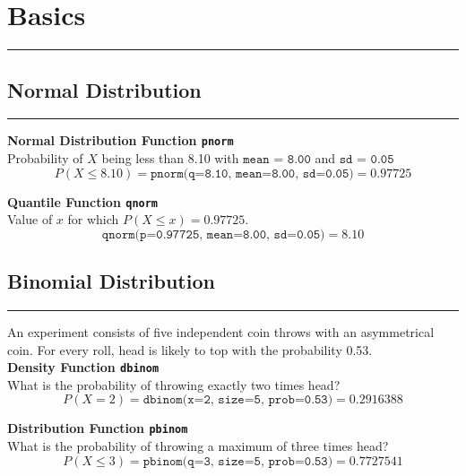 
\section{Basics}
\noindent\rule[\linienAbstand]{\linewidth}{\linienDicke}

\subsection{Normal Distribution}
\noindent\rule[\linienAbstand]{\linewidth}{\linienDicke}
\textbf{Normal Distribution Function \texttt{pnorm}}\\
Probability of $X$ being less than 8.10 with $\texttt{mean = 8.00}$ and $\texttt{sd = 0.05}$
\begin{equation*}
  P(X \leq 8.10) = \texttt{pnorm(q=8.10, mean=8.00, sd=0.05)} = 0.97725
\end{equation*}

\textbf{Quantile Function \texttt{qnorm}}\\
Value of $x$ for which $P(X \leq x) = 0.97725$.
\begin{equation*}
  \texttt{qnorm(p=0.97725, mean=8.00, sd=0.05)} = 8.10
\end{equation*}

\subsection{Binomial Distribution}
\noindent\rule[\linienAbstand]{\linewidth}{\linienDicke}
An experiment consists of five independent coin throws with an asymmetrical coin. For every roll, head is likely to top with the probability 0.53.\\
\textbf{Density Function \texttt{dbinom}}\\
What is the probability of throwing exactly two times head?
\begin{equation*}
  P(X=2) = \texttt{dbinom(x=2, size=5, prob=0.53)} = 0.2916388
\end{equation*}

\textbf{Distribution Function \texttt{pbinom}}\\
What is the probability of throwing a maximum of three times head?
\begin{equation*}
  P(X \leq 3) = \texttt{pbinom(q=3, size=5, prob=0.53)} = 0.7727541
\end{equation*}

